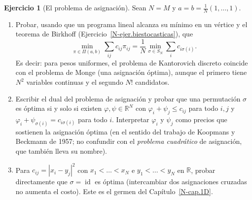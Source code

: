 \documentclass[11pt,a4paper]{amsart}
\newcounter{chapter}
\newcommand{\id}{\operatorname{id}}
\newcommand{\R}{{\mathbb R}}
\theoremstyle{remark}
\theoremstyle{definition}
\newtheorem{ejercicio}{Ejercicio}[chapter]
\numberwithin{subsection}{section}
\numberwithin{equation}{section}
\begin{document}
\begin{ejercicio}[El problema de asignación]\label{ejer.PL.asignacion}
Sean $N=M$ y $a=b=\frac1N(1,\dots,1)$.
\begin{enumerate}[label=(\alph*)]
\item Probar, usando que un programa lineal alcanza su mínimo en un vértice
y el teorema de Birkhoff (Ejercicio~\ref{N-ejer.biestocasticas}), que
\[
\min_{\pi\in\Pi(a,b)}\sum_{ij}c_{ij}\pi_{ij}
=\frac1N\min_{\sigma\in S_N}\sum_ic_{i\sigma(i)}.
\]
Es decir: para pesos uniformes, el problema de Kantorovich discreto coincide
con el problema de Monge (una asignación óptima), aunque el primero tiene
$N^2$ variables continuas y el segundo $N!$ candidatos.
\item Escribir el dual del problema de asignación y probar que una
permutación $\sigma$ es óptima si y solo si existen $\varphi,\psi\in\R^N$
con $\varphi_i+\psi_j\le c_{ij}$ para todo $i,j$ y
$\varphi_i+\psi_{\sigma(i)}=c_{i\sigma(i)}$ para todo $i$. Interpretar
$\varphi_i$ y $\psi_j$ como precios que sostienen la asignación óptima (en
el sentido del trabajo de Koopmans y Beckmann de 1957; no confundir con el
\emph{problema cuadrático} de asignación, que también lleva su nombre).
\item Para $c_{ij}=|x_i-y_j|^2$ con $x_1<\dots<x_N$ e $y_1<\dots<y_N$ en
$\R$, probar directamente que $\sigma=\id$ es óptima (intercambiar dos
asignaciones cruzadas no aumenta el costo). Este es el germen del
Capítulo~\ref{N-cap.1D}.
\end{enumerate}
\end{ejercicio}
\end{document}
